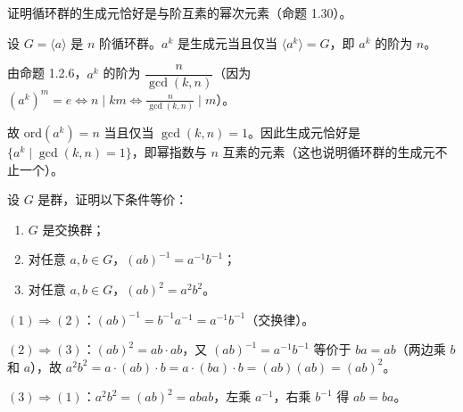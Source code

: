 \begin{homework}
证明循环群的生成元恰好是与阶互素的幂次元素（命题 1.30）。

\begin{solution}
设 $G = \langle a \rangle$ 是 $n$ 阶循环群。$a^k$ 是生成元当且仅当 $\langle a^k \rangle = G$，即 $a^k$ 的阶为 $n$。

由命题 1.2.6，$a^k$ 的阶为 $\dfrac{n}{\gcd(k, n)}$（因为 $(a^k)^m = e \Leftrightarrow n \mid km \Leftrightarrow \frac{n}{\gcd(k,n)} \mid m$）。

故 $\mathrm{ord}(a^k) = n$ 当且仅当 $\gcd(k, n) = 1$。因此生成元恰好是 $\{a^k \mid \gcd(k,n) = 1\}$，即幂指数与 $n$ 互素的元素（这也说明循环群的生成元不止一个）。
\end{solution}
\end{homework}

\begin{homework}[交换群的等价条件]
设 $G$ 是群，证明以下条件等价：
\begin{enumerate}
  \item $G$ 是交换群；
  \item 对任意 $a, b \in G$，$(ab)^{-1} = a^{-1}b^{-1}$；
  \item 对任意 $a, b \in G$，$(ab)^2 = a^2b^2$。
\end{enumerate}

\begin{solution}
$(1) \Rightarrow (2)$：$(ab)^{-1} = b^{-1}a^{-1} = a^{-1}b^{-1}$（交换律）。

$(2) \Rightarrow (3)$：$(ab)^2 = ab \cdot ab$，又 $(ab)^{-1} = a^{-1}b^{-1}$ 等价于 $ba = ab$（两边乘 $b$ 和 $a$），故 $a^2b^2 = a \cdot (ab) \cdot b = a \cdot (ba) \cdot b = (ab)(ab) = (ab)^2$。

$(3) \Rightarrow (1)$：$a^2b^2 = (ab)^2 = abab$，左乘 $a^{-1}$，右乘 $b^{-1}$ 得 $ab = ba$。
\end{solution}
\end{homework}

